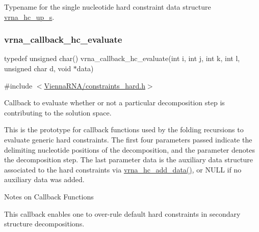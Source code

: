 Typename for the single nucleotide hard constraint data structure \mbox{\hyperlink{group__hard__constraints_structvrna__hc__up__s}{vrna\+\_\+hc\+\_\+up\+\_\+s}}. 

\mbox{\label{group__hard__constraints_gae465f1d4a3d8b6592b38ecbb0d9f613d}} 
\subsubsection{\texorpdfstring{vrna\+\_\+callback\+\_\+hc\+\_\+evaluate}{vrna\_callback\_hc\_evaluate}}
{\footnotesize\ttfamily typedef unsigned char() vrna\+\_\+callback\+\_\+hc\+\_\+evaluate(int i, int j, int k, int l, unsigned char d, void $\ast$data)}



{\ttfamily \#include $<$\mbox{\hyperlink{constraints__hard_8h}{Vienna\+R\+N\+A/constraints\+\_\+hard.\+h}}$>$}



Callback to evaluate whether or not a particular decomposition step is contributing to the solution space. 

This is the prototype for callback functions used by the folding recursions to evaluate generic hard constraints. The first four parameters passed indicate the delimiting nucleotide positions of the decomposition, and the parameter {\ttfamily denotes} the decomposition step. The last parameter {\ttfamily data} is the auxiliary data structure associated to the hard constraints via \mbox{\hyperlink{constraints__hard_8h_a128920e0af52e4196a9d59fa13336c7c}{vrna\+\_\+hc\+\_\+add\+\_\+data()}}, or N\+U\+LL if no auxiliary data was added.

\begin{DoxyRefDesc}{Notes on Callback Functions}
\item[\mbox{\hyperlink{callbacks__callbacks000001}{Notes on Callback Functions}}]This callback enables one to over-\/rule default hard constraints in secondary structure decompositions. \end{DoxyRefDesc}



